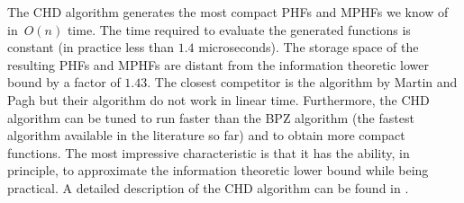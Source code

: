 The CHD algorithm generates the most compact PHFs and MPHFs we know of in~$O(n)$ time. 
The time required to evaluate the generated functions is constant (in practice less than $1.4$ microseconds). 
The storage space of the resulting PHFs and MPHFs are distant from the information 
theoretic lower bound by a factor of $1.43$.
The closest competitor is the algorithm by Martin and Pagh \cite{dp08} but
their algorithm do not work in linear time.
Furthermore, the CHD algorithm 
can be tuned to run faster than the BPZ algorithm \cite{bpz07} (the fastest algorithm
available in the literature so far) and to obtain more compact functions.
The most impressive characteristic is that it has the ability, in principle, to
approximate the information theoretic lower bound while being practical.
A detailed description of the CHD algorithm can be found in \cite{bbd09}. 



